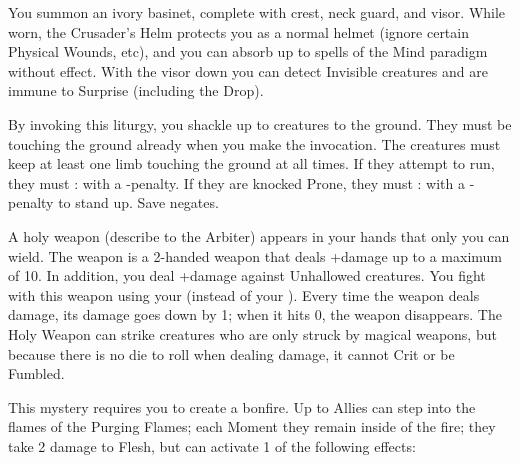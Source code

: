 \MYSTERY [
  Name = Crusader's Helm,
  Link = arcana-mystery-crusaders-helm,
  Paradigm = Force,
  Save = n/a,
  Duration = Session,
  Target = Self
]

You summon an ivory basinet, complete with crest, neck guard, and visor.  While worn, the Crusader's Helm protects you as a normal helmet (ignore certain Physical Wounds, etc), and you can absorb up to \DICE spells of the Mind paradigm without effect.  With the visor down you can detect Invisible creatures and are immune to Surprise (including the Drop).

\MYSTERY [
  Name = Grounding Mantra,
  Link = arcana-mystery-grounding-mantra,
  Paradigm = Elements,
  Save = Y (neg.),
  Duration = Markovian,
  Target = Close\, Nearby\, or Far-Away Target(s)
]

By invoking this liturgy, you shackle up to \DICE creatures to the ground.  They must be touching the ground already when you make the invocation.  The creatures must keep at least one limb touching the ground at all times.  If they attempt to run, they must \RB : \DEX with a -\DICE penalty.  If they are knocked Prone, they must \RB : \VIG with a -\DICE penalty to stand up.  Save negates.

\MYSTERY [
  Name = Holy Weapon,
  Link = arcana-mystery-holy-weapon,
  Paradigm = Force,
  Save = n/a,
  Duration = Session,
  Target = Self
]

A holy weapon (describe to the Arbiter) appears in your hands that only you can wield.  The weapon is a 2-handed weapon that deals \DICE+\DICE damage up to a maximum of 10.  In addition, you deal +\DICE damage against Unhallowed creatures. You fight with this weapon using your \FOC (instead of your \VIG). Every time the weapon deals damage, its damage goes down by 1; when it hits 0, the weapon disappears.  The Holy Weapon can strike creatures who are only struck by magical weapons, but because there is no die to roll when dealing damage, it cannot Crit or be Fumbled. 

\MYSTERY [
  Name = Purging Fire,
  Link = arcana-mystery-purging-fire,
  Paradigm = Elements,
  Save = N,
  Duration = \SUM Minutes,
  Target = See Below
]

This mystery requires you to create a bonfire.  Up to \DICE Allies can step into the flames of the Purging Flames; each Moment they remain inside of the fire; they take 2 damage to Flesh, but can activate 1 of the following effects:


